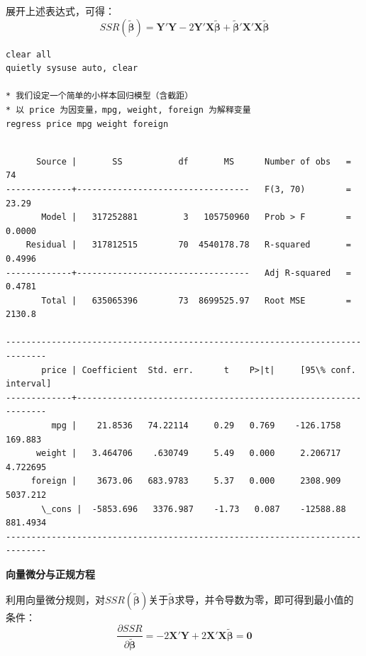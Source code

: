 展开上述表达式，可得：
\begin{equation}
	SSR(\tilde{\boldsymbol{\beta}}) = \mathbf{Y}'\mathbf{Y} - 2\mathbf{Y}'\mathbf{X}\tilde{\boldsymbol{\beta}} + \tilde{\boldsymbol{\beta}}'\mathbf{X}'\mathbf{X}\tilde{\boldsymbol{\beta}}
\end{equation}

\begin{tcolorbox}[title=使用Stata 中的 auto 数据集进行演示, colback=white, colframe=black, colbacktitle=white, coltitle=black,fonttitle=\bfseries]
	\begin{lstlisting}[xleftmargin=2em, commentstyle=\color{black}]
clear all
quietly sysuse auto, clear

* 我们设定一个简单的小样本回归模型（含截距）
* 以 price 为因变量，mpg, weight, foreign 为解释变量
regress price mpg weight foreign
	\end{lstlisting}
	\vspace{-2em}
	\begin{Verbatim}[commandchars=\\\{\},xleftmargin=2em]

      Source |       SS           df       MS      Number of obs   =        74
-------------+----------------------------------   F(3, 70)        =     23.29
       Model |   317252881         3   105750960   Prob > F        =    0.0000
    Residual |   317812515        70  4540178.78   R-squared       =    0.4996
-------------+----------------------------------   Adj R-squared   =    0.4781
       Total |   635065396        73  8699525.97   Root MSE        =    2130.8

------------------------------------------------------------------------------
       price | Coefficient  Std. err.      t    P>|t|     [95\% conf. interval]
-------------+----------------------------------------------------------------
         mpg |    21.8536   74.22114     0.29   0.769    -126.1758     169.883
      weight |   3.464706    .630749     5.49   0.000     2.206717    4.722695
     foreign |    3673.06   683.9783     5.37   0.000     2308.909    5037.212
       \_cons |  -5853.696   3376.987    -1.73   0.087    -12588.88    881.4934
------------------------------------------------------------------------------
	\end{Verbatim}

\end{tcolorbox}

\textbf{向量微分与正规方程}

利用向量微分规则，对$SSR(\tilde{\boldsymbol{\beta}})$关于$\tilde{\boldsymbol{\beta}}$求导，并令导数为零，即可得到最小值的条件：
\begin{equation}
	\frac{\partial SSR}{\partial \tilde{\boldsymbol{\beta}}} = -2\mathbf{X}'\mathbf{Y} + 2\mathbf{X}'\mathbf{X}\tilde{\boldsymbol{\beta}} = \mathbf{0}
\end{equation}

